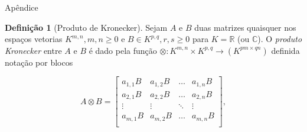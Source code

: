 \documentclass{beamer}
\newcommand{\R}{\mathbb{R}}
\newcommand{\C}{\mathbb{C}}
\theoremstyle{plain}
\theoremstyle{definition}
\newtheorem{defi}{Definição}
\begin{document}

\begin{frame}{Apêndice}

    \small
    \begin{defi}[Produto de Kronecker]
        \label{apendices:def:kronecker_product}
        Sejam $A$ e $B$ duas matrizes quaisquer nos espaços vetorias $K^{m, n}, m,n \geq 0$ e $B \in K^{p, q}, r,s \geq 0$ 
        para $K = \R$ (ou $\C$). O \textit{produto Kronecker} entre $A$ e $B$ é dado pela função
        $\otimes: K^{m, n} \times K^{p, q} \to (K^{pm \times qn})$ definida notação por blocos

        \noindent
        \[
            A \otimes B = 
            \begin{bmatrix}
                a_{1,1} B & a_{1,2} B & \dots & a_{1, n} B \\
                a_{2,1} B & a_{2,2} B & \dots & a_{2, n} B \\
                \vdots & \vdots & \ddots & \vdots \\
                a_{m,1} B & a_{m,2} B & \dots & a_{m, n} B \\
            \end{bmatrix},
        \]


    \end{defi}

     
\end{frame}


\end{document}
